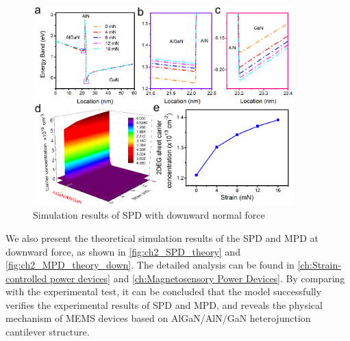 \begin{figure}[H] 
\centering    
\includegraphics[width=0.9\textwidth]{ch2_SPD_theory}
\caption[Simulation results of SPD with downward normal force]{Simulation results of SPD with downward normal force}
\label{fig:ch2_SPD_theory}
\end{figure}


We also present the theoretical simulation results of the  SPD and MPD  at downward force, as shown in \autoref{fig:ch2_SPD_theory} and \autoref{fig:ch2_MPD_theory_down}. The detailed analysis can be found in \autoref{ch:Strain-controlled power devices} and \autoref{ch:Magnetosensory Power Devices}. By comparing with the experimental test, it can be concluded that the model successfully verifies the experimental results of SPD and MPD, and reveals the physical mechanism  of MEMS  devices based on AlGaN/AlN/GaN  heterojunction cantilever  structure.

